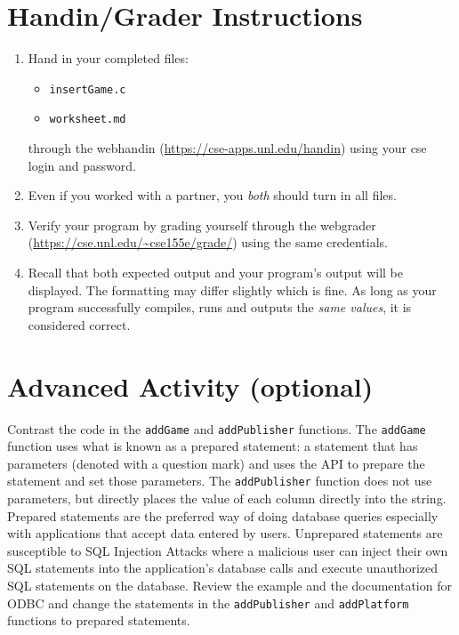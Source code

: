 \documentclass[12pt]{scrartcl}
\begin{document}
\section{Handin/Grader Instructions}

\begin{enumerate}
  \item Hand in your completed files:
  \begin{itemize}
    \item \texttt{insertGame.c}
    \item \texttt{worksheet.md}
  \end{itemize}
  through the webhandin (\url{https://cse-apps.unl.edu/handin}) 
  using your cse login and password.  
  \item Even if you worked with a partner, you \emph{both} should
  turn in all files.
  \item Verify your program by grading yourself through the
  webgrader (\url{https://cse.unl.edu/~cse155e/grade/}) using the
  same credentials.
  \item Recall that both expected output and your program's output
  will be displayed.  The formatting may differ slightly which is fine.
  As long as your program successfully compiles, runs and outputs 
  the \emph{same values}, it is considered correct.
\end{enumerate}


\section{Advanced Activity (optional)}

Contrast the code in the \texttt{addGame} and 
\texttt{addPublisher} functions.  The \texttt{addGame} 
function uses what is known as a prepared statement: a statement 
that has parameters (denoted with a question mark) and uses the 
API to prepare the statement and set those parameters.  The 
\texttt{addPublisher} function does not use parameters, but 
directly places the value of each column directly into the string.  
Prepared statements are the preferred way of doing database 
queries especially with applications that accept data entered by 
users.  Unprepared statements are susceptible to SQL Injection 
Attacks where a malicious user can inject their own SQL statements 
into the application's database calls and execute unauthorized 
SQL statements on the database.  Review the example and the 
documentation for ODBC and change the statements in the 
\texttt{addPublisher} and \texttt{addPlatform} 
functions to prepared statements.

	
\end{document}
